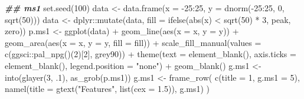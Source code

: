 \documentclass[
]{article}
\newenvironment{Shaded}{\begin{snugshade}}{\end{snugshade}}
\newcommand{\AttributeTok}[1]{\textcolor[rgb]{0.77,0.63,0.00}{#1}}
\newcommand{\DecValTok}[1]{\textcolor[rgb]{0.00,0.00,0.81}{#1}}
\newcommand{\DocumentationTok}[1]{\textcolor[rgb]{0.56,0.35,0.01}{\textbf{\textit{#1}}}}
\newcommand{\FloatTok}[1]{\textcolor[rgb]{0.00,0.00,0.81}{#1}}
\newcommand{\FunctionTok}[1]{\textcolor[rgb]{0.00,0.00,0.00}{#1}}
\newcommand{\NormalTok}[1]{#1}
\newcommand{\OtherTok}[1]{\textcolor[rgb]{0.56,0.35,0.01}{#1}}
\newcommand{\SpecialCharTok}[1]{\textcolor[rgb]{0.00,0.00,0.00}{#1}}
\newcommand{\StringTok}[1]{\textcolor[rgb]{0.31,0.60,0.02}{#1}}
\begin{document}
\begin{Shaded}
\begin{Highlighting}[]
\DocumentationTok{\#\# ms1}
\FunctionTok{set.seed}\NormalTok{(}\DecValTok{100}\NormalTok{)}
\NormalTok{data }\OtherTok{\textless{}{-}} \FunctionTok{data.frame}\NormalTok{(}\AttributeTok{x =} \SpecialCharTok{{-}}\DecValTok{25}\SpecialCharTok{:}\DecValTok{25}\NormalTok{, }\AttributeTok{y =} \FunctionTok{dnorm}\NormalTok{(}\SpecialCharTok{{-}}\DecValTok{25}\SpecialCharTok{:}\DecValTok{25}\NormalTok{, }\DecValTok{0}\NormalTok{, }\FunctionTok{sqrt}\NormalTok{(}\DecValTok{50}\NormalTok{)))}
\NormalTok{data }\OtherTok{\textless{}{-}}\NormalTok{ dplyr}\SpecialCharTok{::}\FunctionTok{mutate}\NormalTok{(data, }\AttributeTok{fill =} \FunctionTok{ifelse}\NormalTok{(}\FunctionTok{abs}\NormalTok{(x) }\SpecialCharTok{\textless{}} \FunctionTok{sqrt}\NormalTok{(}\DecValTok{50}\NormalTok{) }\SpecialCharTok{*} \DecValTok{3}\NormalTok{, }\StringTok{\textquotesingle{}peak\textquotesingle{}}\NormalTok{, }\StringTok{\textquotesingle{}zero\textquotesingle{}}\NormalTok{))}
\NormalTok{p.ms1 }\OtherTok{\textless{}{-}} \FunctionTok{ggplot}\NormalTok{(data) }\SpecialCharTok{+}
  \FunctionTok{geom\_line}\NormalTok{(}\FunctionTok{aes}\NormalTok{(}\AttributeTok{x =}\NormalTok{ x, }\AttributeTok{y =}\NormalTok{ y)) }\SpecialCharTok{+}
  \FunctionTok{geom\_area}\NormalTok{(}\FunctionTok{aes}\NormalTok{(}\AttributeTok{x =}\NormalTok{ x, }\AttributeTok{y =}\NormalTok{ y, }\AttributeTok{fill =}\NormalTok{ fill)) }\SpecialCharTok{+}
  \FunctionTok{scale\_fill\_manual}\NormalTok{(}\AttributeTok{values =} \FunctionTok{c}\NormalTok{(ggsci}\SpecialCharTok{::}\FunctionTok{pal\_npg}\NormalTok{()(}\DecValTok{2}\NormalTok{)[}\DecValTok{2}\NormalTok{], }\StringTok{\textquotesingle{}grey90\textquotesingle{}}\NormalTok{)) }\SpecialCharTok{+}
  \FunctionTok{theme}\NormalTok{(}\AttributeTok{text =} \FunctionTok{element\_blank}\NormalTok{(),}
    \AttributeTok{axis.ticks =} \FunctionTok{element\_blank}\NormalTok{(),}
    \AttributeTok{legend.position =} \StringTok{"none"}\NormalTok{) }\SpecialCharTok{+} 
  \FunctionTok{geom\_blank}\NormalTok{()}
\NormalTok{g.ms1 }\OtherTok{\textless{}{-}} \FunctionTok{into}\NormalTok{(}\FunctionTok{glayer}\NormalTok{(}\DecValTok{3}\NormalTok{, .}\DecValTok{1}\NormalTok{), }\FunctionTok{as\_grob}\NormalTok{(p.ms1))}
\NormalTok{g.ms1 }\OtherTok{\textless{}{-}} \FunctionTok{frame\_row}\NormalTok{(}
  \FunctionTok{c}\NormalTok{(}\AttributeTok{title =} \DecValTok{1}\NormalTok{, }\AttributeTok{g.ms1 =} \DecValTok{5}\NormalTok{),}
  \FunctionTok{namel}\NormalTok{(}\AttributeTok{title =} \FunctionTok{gtext}\NormalTok{(}\StringTok{"Features"}\NormalTok{, }\FunctionTok{list}\NormalTok{(}\AttributeTok{cex =} \FloatTok{1.5}\NormalTok{)), g.ms1)}
\NormalTok{)}


\end{Highlighting}
\end{Shaded}
\end{document}
